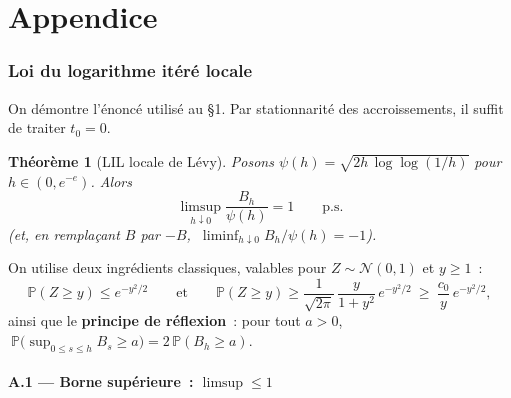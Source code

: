 \documentclass[11pt,a4paper]{article}
\theoremstyle{plain}
\newtheorem{theoreme}{Théorème}
\theoremstyle{definition}
\newcommand{\Prob}{\mathbb{P}}
\newcommand{\Loi}{\mathcal{N}}
\newcommand{\ps}{\text{p.s.}}
\begin{document}
\appendix
\part*{Appendice}
\section{Loi du logarithme it\'er\'e locale}\label{app:lil}

On d\'emontre l'\'enonc\'e utilis\'e au \S1. Par stationnarit\'e des accroissements, il suffit de traiter $t_0=0$.

\begin{theoreme}[LIL locale de L\'evy]\label{th:lil}
Posons $\psi(h)=\sqrt{2h\,\log\log(1/h)}$ pour $h\in(0,e^{-e})$. Alors
\[
\limsup_{h\downarrow 0}\frac{B_h}{\psi(h)}=1\qquad\ps
\]
(et, en rempla\c cant $B$ par $-B$, $\ \liminf_{h\downarrow 0} B_h/\psi(h)=-1$).
\end{theoreme}

On utilise deux ingr\'edients classiques, valables pour $Z\sim\Loi(0,1)$ et $y\ge 1$~:
\begin{equation}\label{eq:gauss}
\Prob(Z\ge y)\le e^{-y^2/2}
\qquad\text{et}\qquad
\Prob(Z\ge y)\ge \frac{1}{\sqrt{2\pi}}\,\frac{y}{1+y^2}\,e^{-y^2/2}\ \ge\ \frac{c_0}{y}\,e^{-y^2/2},
\end{equation}
ainsi que le \textbf{principe de r\'eflexion}~: pour tout $a>0$, $\ \Prob\bigl(\sup_{0\le s\le h}B_s\ge a\bigr)=2\,\Prob(B_h\ge a)$.

\subsection*{A.1 — Borne sup\'erieure~: $\limsup\le 1$ \ps}
\end{document}
